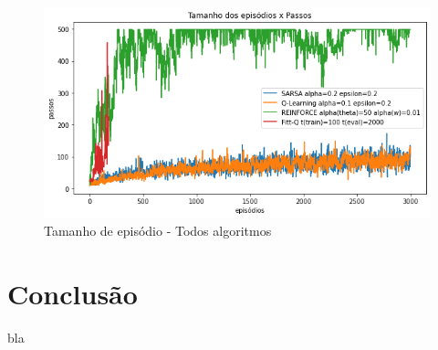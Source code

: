 \documentclass[letterpaper]{article}
\begin{document}
\begin{figure}[t]
  \centering
  \includegraphics[width=0.9\columnwidth]{exp-allalgs-episodes}
  \caption{Tamanho de episódio - Todos algoritmos}
  \label{fig:exp-allalgs-episodes}
\end{figure}

\section{Conclusão}

bla



\end{document}
